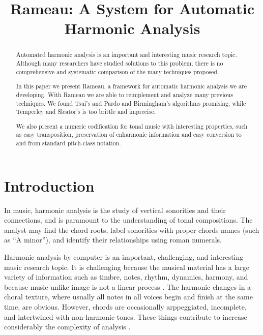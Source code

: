 \documentclass{article}
\title{Rameau: A System for Automatic Harmonic Analysis}
\begin{document}
\graphicspath{{figs/}{data/}}
\maketitle

\begin{abstract}

  Automated harmonic analysis is an important and interesting music
  research topic. Although many researchers have studied solutions to
  this problem, there is no comprehensive and systematic comparison of
  the many techniques proposed.

  In this paper we present Rameau, a framework for automatic harmonic
  analysis we are developing. With Rameau we are able to reimplement
  and analyze many previous techniques. We found Tsui's
  \cite{tsui:harmonic} and Pardo and Birmingham's
  \cite{pardo.ea:automated-report} algorithms promising, while
  Temperley and Sleator's \cite{temperley.ea:modeling} is too brittle
  and imprecise. 

  We also present a numeric codification for tonal music with
  interesting properties, such as easy transposition, preservation of
  enharmonic information and easy conversion to and from standard
  pitch-class notation.

\end{abstract}

\section{Introduction}
\label{sec:introduction}

In music, harmonic analysis is the study of vertical sonorities and
their connections, and is paramount to the understanding of tonal
compositions. The analyst may find the chord roots, label
sonorities with proper chords names (such as ``A minor''), and
identify their relationships using roman numerals.

Harmonic analysis by computer is an important, challenging, and
interesting music research topic. It is challenging because the
musical material has a large variety of information such as timbre,
notes, rhythm, dynamics, harmony, and because music unlike image is not a
linear process \cite{mouton.ea:numeric}. The harmonic changes in a choral
texture, where usually all notes in all voices begin and finish at the
same time, are obvious. However, chords are occasionally arppeggiated,
incomplete, and intertwined with non-harmonic tones. These things
contribute to increase considerably the complexity of analysis
\cite{pardo.ea:automated}.
\end{document}

